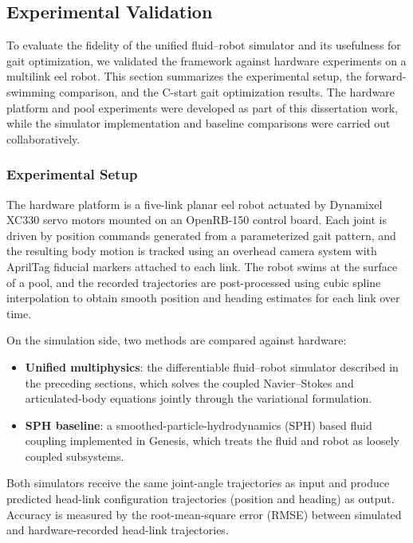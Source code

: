 \subsection{Experimental Validation}
\label{sec:fsi_experimental_validation}

To evaluate the fidelity of the unified fluid--robot simulator and its usefulness for gait optimization, we validated the framework against hardware experiments on a multilink eel robot. This section summarizes the experimental setup, the forward-swimming comparison, and the C-start gait optimization results. The hardware platform and pool experiments were developed as part of this dissertation work, while the simulator implementation and baseline comparisons were carried out collaboratively.

\subsubsection{Experimental Setup}

The hardware platform is a five-link planar eel robot actuated by Dynamixel XC330 servo motors mounted on an OpenRB-150 control board. Each joint is driven by position commands generated from a parameterized gait pattern, and the resulting body motion is tracked using an overhead camera system with AprilTag fiducial markers attached to each link. The robot swims at the surface of a pool, and the recorded trajectories are post-processed using cubic spline interpolation to obtain smooth position and heading estimates for each link over time.

On the simulation side, two methods are compared against hardware:
\begin{itemize}
    \item \textbf{Unified multiphysics}: the differentiable fluid--robot simulator described in the preceding sections, which solves the coupled Navier--Stokes and articulated-body equations jointly through the variational formulation.
    \item \textbf{SPH baseline}: a smoothed-particle-hydrodynamics (SPH) based fluid coupling implemented in Genesis, which treats the fluid and robot as loosely coupled subsystems.
\end{itemize}
Both simulators receive the same joint-angle trajectories as input and produce predicted head-link configuration trajectories (position and heading) as output. Accuracy is measured by the root-mean-square error (RMSE) between simulated and hardware-recorded head-link trajectories.

